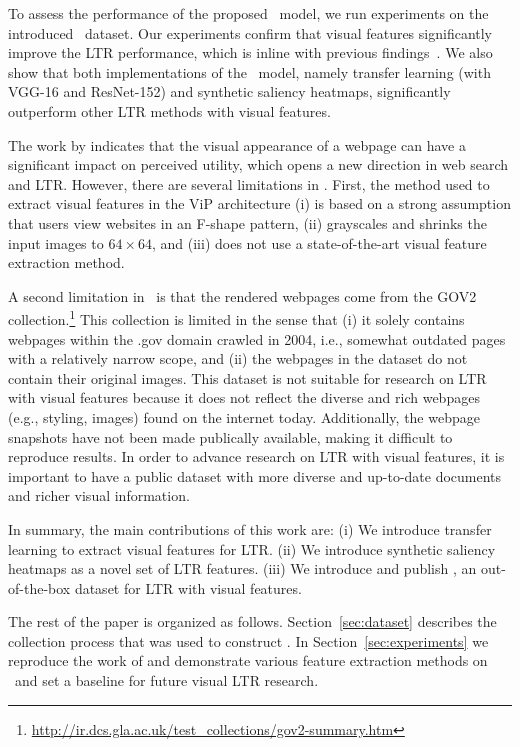 To assess the performance of the proposed \modelname~model, we run experiments on the introduced \datasetname~dataset.
Our experiments confirm that visual features significantly improve the \ac{LTR} performance, which is inline with previous findings~\cite{fan2017learning}.
We also show that both implementations of the \modelname~model, namely transfer learning (with VGG-16 and ResNet-152) and synthetic saliency heatmaps,
significantly outperform other \ac{LTR} methods with visual features.

The work by \citet{fan2017learning} indicates that the visual appearance of a webpage can have a significant impact on perceived utility, which opens a new direction in web search and \ac{LTR}.
However, there are several limitations in \cite{fan2017learning}.
First, the method used to extract visual features in the ViP architecture
(i) is based on a strong assumption that users view websites in an F-shape pattern, 
(ii) grayscales and shrinks the input images to $64\times64$, and
(iii) does not use a state-of-the-art visual feature extraction method.

A second limitation in~\citep{fan2017learning} is that
the rendered webpages come from the GOV2 collection.\footnote{\url{http://ir.dcs.gla.ac.uk/test_collections/gov2-summary.htm}}
This collection is limited in the sense that 
(i) it solely contains webpages within the .gov domain crawled in 2004, i.e., somewhat outdated pages with a relatively narrow scope, and
(ii) the webpages in the dataset do not contain their original images.
This dataset is not suitable for research on \ac{LTR} with visual features because it does not reflect the diverse and rich webpages (e.g., styling, images) found on the internet today. 
Additionally, the webpage snapshots have not been made publically available, making it difficult to reproduce results. 
In order to advance research on \ac{LTR} with visual features, it is important to have a public dataset with more diverse and up-to-date documents and richer visual information.
\fi


In summary, the main contributions of this work are:
(i) We introduce transfer learning to extract visual features for \ac{LTR}.
(ii) We introduce synthetic saliency heatmaps as a novel set of \ac{LTR} features.
(iii) We introduce and publish \datasetname, an out-of-the-box dataset for \ac{LTR} with visual features.


 The rest of the paper is organized as follows. Section~\ref{sec:dataset} describes the collection process that was used to construct \datasetname. In Section~\ref{sec:experiments} we reproduce the work of \citet{fan2017learning} and demonstrate various feature extraction methods on \datasetname~and set a baseline for future visual \ac{LTR} research.  
\fi